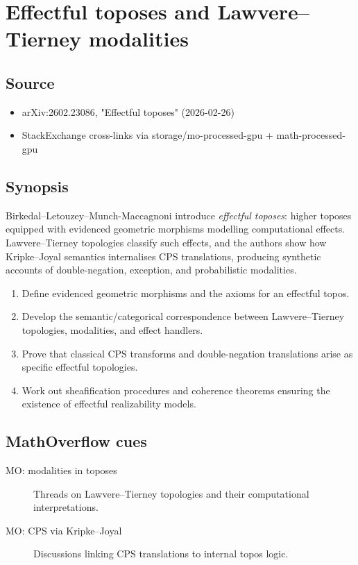 \section*{Effectful toposes and Lawvere--Tierney modalities}
\subsection*{Source}
\begin{itemize}
  \item arXiv:2602.23086, "Effectful toposes" (2026-02-26)
  \item StackExchange cross-links via storage/mo-processed-gpu + math-processed-gpu
\end{itemize}
\subsection*{Synopsis}
Birkedal--Letouzey--Munch-Maccagnoni introduce \emph{effectful toposes}: higher toposes equipped with evidenced geometric morphisms modelling computational effects. Lawvere--Tierney topologies classify such effects, and the authors show how Kripke--Joyal semantics internalises CPS translations, producing synthetic accounts of double-negation, exception, and probabilistic modalities.
\begin{enumerate}
  \item Define evidenced geometric morphisms and the axioms for an effectful topos.
  \item Develop the semantic/categorical correspondence between Lawvere--Tierney topologies, modalities, and effect handlers.
  \item Prove that classical CPS transforms and double-negation translations arise as specific effectful topologies.
  \item Work out sheafification procedures and coherence theorems ensuring the existence of effectful realizability models.
\end{enumerate}
\subsection*{MathOverflow cues}
\begin{description}
  \item[MO: modalities in toposes] Threads on Lawvere--Tierney topologies and their computational interpretations.
  \item[MO: CPS via Kripke--Joyal] Discussions linking CPS translations to internal topos logic.
\end{description}
